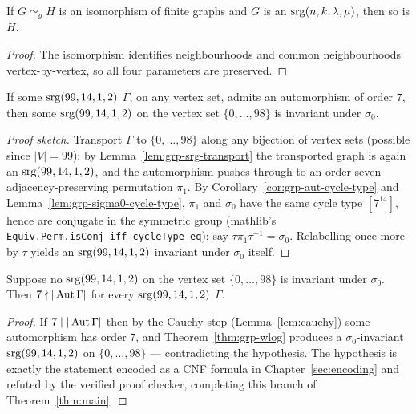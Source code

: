 \begin{lemma}\label{lem:grp-srg-transport}
If $G \simeq_g H$ is an isomorphism of finite graphs and $G$ is an
$\mathrm{srg}(n,k,\lambda,\mu)$, then so is $H$.
\leanok
{}
\end{lemma}

\begin{proof}\leanok
The isomorphism identifies neighbourhoods and common neighbourhoods
vertex-by-vertex, so all four parameters are preserved.
\end{proof}

\begin{theorem}\label{thm:grp-wlog}
If some $\mathrm{srg}(99,14,1,2)$ $\Gamma$, on any vertex set, admits an automorphism
of order $7$, then some $\mathrm{srg}(99,14,1,2)$ on the vertex set $\{0,\dots,98\}$
is invariant under $\sigma_0$.
\leanok
{}
\end{theorem}

\begin{proof}[Proof sketch]\leanok
{}
Transport $\Gamma$ to $\{0,\dots,98\}$ along any bijection of vertex sets
(possible since $|V| = 99$); by Lemma~\ref{lem:grp-srg-transport} the
transported graph is again an $\mathrm{srg}(99,14,1,2)$, and the automorphism pushes
through to an order-seven adjacency-preserving permutation $\pi_1$.  By
Corollary~\ref{cor:grp-aut-cycle-type} and
Lemma~\ref{lem:grp-sigma0-cycle-type}, $\pi_1$ and $\sigma_0$ have the same
cycle type $[7^{14}]$, hence are conjugate in the symmetric group
(mathlib's \texttt{Equiv.Perm.isConj\_iff\_cycleType\_eq}); say
$\tau \pi_1 \tau^{-1} = \sigma_0$.  Relabelling once more by $\tau$ yields an
$\mathrm{srg}(99,14,1,2)$ invariant under $\sigma_0$ itself.
\end{proof}

\begin{theorem}\label{thm:reduction}
Suppose no $\mathrm{srg}(99,14,1,2)$ on the vertex set $\{0,\dots,98\}$ is invariant
under $\sigma_0$.  Then $7 \nmid |\operatorname{Aut}\Gamma|$ for every $\mathrm{srg}(99,14,1,2)$
$\Gamma$.
\leanok
{}
\end{theorem}

\begin{proof}\leanok
{}
If $7 \mid |\operatorname{Aut}\Gamma|$ then by the Cauchy step (Lemma~\ref{lem:cauchy})
some automorphism has order $7$, and Theorem~\ref{thm:grp-wlog} produces a
$\sigma_0$-invariant $\mathrm{srg}(99,14,1,2)$ on $\{0,\dots,98\}$ --- contradicting
the hypothesis.  The hypothesis is exactly the statement encoded as a CNF
formula in Chapter~\ref{sec:encoding} and refuted by the verified proof
checker, completing this branch of Theorem~\ref{thm:main}.
\end{proof}

